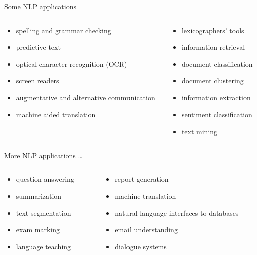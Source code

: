 \documentclass[compress]{beamer}
\begin{document}
\begin{frame}{Some NLP applications} 
  \begin{columns}
    \begin{column}{.5\textwidth}
      \begin{itemize}
      \item spelling and grammar checking
      \item predictive text
      \item optical character recognition (OCR)
      \item screen readers 
      \item augmentative and alternative communication
      \item machine aided translation 
      \end{itemize}
    \end{column}
    
    \begin{column}{.5\textwidth}
      \begin{itemize}
      \item lexicographers' tools 
      \item information retrieval
      \item document classification 
      \item document clustering
      \item information extraction
      \item sentiment classification
      \item text mining
      \end{itemize}
    \end{column}
  \end{columns}
\end{frame} 

\begin{frame}{More NLP applications \ldots} 
  \begin{columns}
    \begin{column}{.5\textwidth}
      \begin{itemize}
      \item question answering
      \item summarization
      \item text segmentation
      \item exam marking
      \item language teaching
      \end{itemize}
    \end{column}

    \begin{column}{.5\textwidth}
      \begin{itemize}
      \item report generation
      \item machine translation
      \item natural language interfaces to databases
      \item email understanding
      \item dialogue systems
      \end{itemize}
    \end{column}
  \end{columns}
\end{frame}
\end{document}
